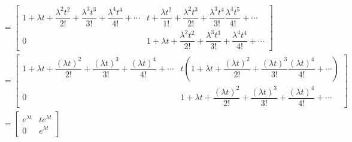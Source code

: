 \begin{example}
\begin{align*}
        \\
        & = \begin{bmatrix} 1 + \lambda t + \dfrac{\lambda^2 t^2}{2!} + \dfrac{\lambda^3 t^3}{3!} + \dfrac{\lambda^4 t^4}{4!} + \cdots & t + \dfrac{\lambda t^2}{1!} + \dfrac{\lambda^2 t^3}{2!} + \dfrac{\lambda^3 t^4}{3!} \dfrac{\lambda^4 t^5}{4!} + \cdots \\[3mm] 0 & 1 + \lambda t + \dfrac{\lambda^2 t^2}{2!} + \dfrac{\lambda^3 t^3}{3!} + \dfrac{\lambda^4 t^4}{4!} + \cdots \end{bmatrix} \\
        & = \begin{bmatrix} 1 + \lambda t + \dfrac{(\lambda t)^2}{2!} + \dfrac{(\lambda t)^3}{3!} + \dfrac{(\lambda t)^4}{4!} + \cdots & t\left( 1 + \lambda t + \dfrac{(\lambda t)^2}{2!} + \dfrac{(\lambda t)^3}{3!} \dfrac{(\lambda t)^4}{4!} + \cdots \right) \\[3mm] 0 & 1 + \lambda t + \dfrac{(\lambda t)^2}{2!} + \dfrac{(\lambda t)^3}{3!} + \dfrac{(\lambda t)^4}{4!} + \cdots \end{bmatrix} \\
        & = \begin{bmatrix} e^{\lambda t} & te^{\lambda t} \\ 0 & e^{\lambda t} \end{bmatrix}
    \end{align*}
\end{example}

